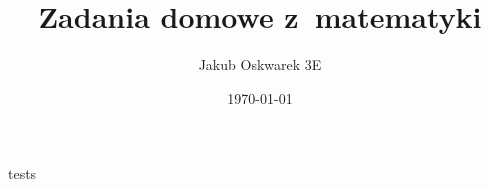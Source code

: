 \documentclass[a4paper, fleqn, oneside]{report}
\title{Zadania domowe z~matematyki}
\author{Jakub Oskwarek 3E}
\date{\today}
\begin{document}
    tests
\end{document}
